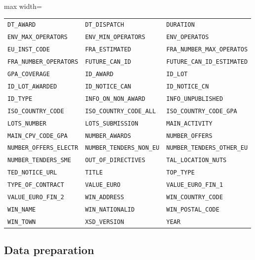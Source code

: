 \documentclass[a4paper,fleqn]{cas-sc}
\begin{document}
\begin{table}[t]
\begin{adjustbox}{max width=\textwidth}
\begin{tabular}{p{4cm}p{4.2cm}p{4.7cm}}
	\texttt{DT\_AWARD} & \texttt{DT\_DISPATCH} & \texttt{DURATION} \\
	\texttt{ENV\_MAX\_OPERATORS} & \texttt{ENV\_MIN\_OPERATORS} & \texttt{ENV\_OPERATOS} \\
	\texttt{EU\_INST\_CODE} & \texttt{FRA\_ESTIMATED} & \texttt{FRA\_NUMBER\_MAX\_OPERATOS} \\
	\texttt{FRA\_NUMBER\_OPERATORS} & \texttt{FUTURE\_CAN\_ID} & \texttt{FUTURE\_CAN\_ID\_ESTIMATED} \\
	\texttt{GPA\_COVERAGE} & \texttt{ID\_AWARD} & \texttt{ID\_LOT} \\
	\texttt{ID\_LOT\_AWARDED} & \texttt{ID\_NOTICE\_CAN} & \texttt{ID\_NOTICE\_CN} \\
	\texttt{ID\_TYPE} & \texttt{INFO\_ON\_NON\_AWARD} & \texttt{INFO\_UNPUBLISHED} \\
	\texttt{ISO\_COUNTRY\_CODE} & \texttt{ISO\_COUNTRY\_CODE\_ALL} & \texttt{ISO\_COUNTRY\_CODE\_GPA} \\
	\texttt{LOTS\_NUMBER} & \texttt{LOTS\_SUBMISSION} & \texttt{MAIN\_ACTIVITY} \\
	\texttt{MAIN\_CPV\_CODE\_GPA} & \texttt{NUMBER\_AWARDS} & \texttt{NUMBER\_OFFERS} \\
	\texttt{NUMBER\_OFFERS\_ELECTR} & \texttt{NUMBER\_TENDERS\_NON\_EU} & \texttt{NUMBER\_TENDERS\_OTHER\_EU} \\
	\texttt{NUMBER\_TENDERS\_SME} & \texttt{OUT\_OF\_DIRECTIVES} & \texttt{TAL\_LOCATION\_NUTS} \\
	\texttt{TED\_NOTICE\_URL} & \texttt{TITLE} & \texttt{TOP\_TYPE} \\
	\texttt{TYPE\_OF\_CONTRACT} & \texttt{VALUE\_EURO} & \texttt{VALUE\_EURO\_FIN\_1} \\
	\texttt{VALUE\_EURO\_FIN\_2} & \texttt{WIN\_ADDRESS} & \texttt{WIN\_COUNTRY\_CODE} \\
	\texttt{WIN\_NAME} & \texttt{WIN\_NATIONALID} & \texttt{WIN\_POSTAL\_CODE} \\
	\texttt{WIN\_TOWN} & \texttt{XSD\_VERSION} & \texttt{YEAR} \\
	\hline
	
	\end{tabular}
\end{adjustbox}		


\end{table}	
    
    

\subsection*{Data preparation}\label{sec:fase6-iteracion1}
\end{document}

